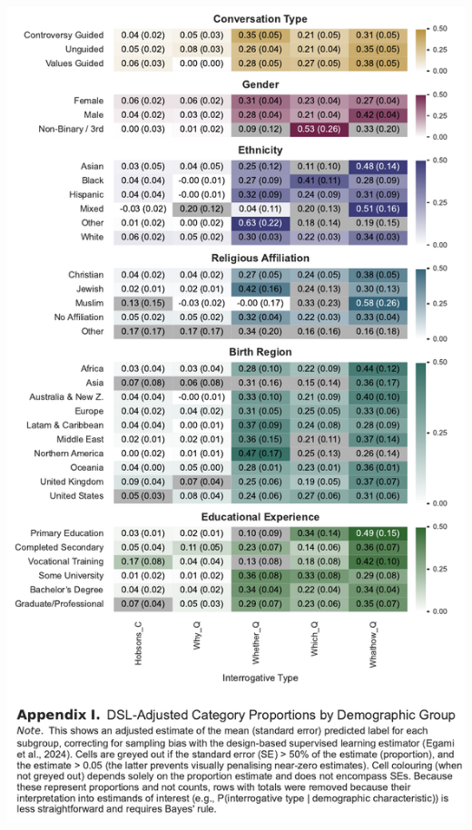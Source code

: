 \documentclass[
  12pt,
]{article}
\begin{document}
\begin{center}\includegraphics{../03_outputs/02_descriptive_analyses/appendix_i} \end{center}
\end{document}
